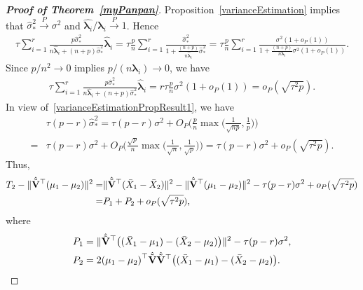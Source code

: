 \documentclass[times,sort&compress,3p]{elsarticle}
\newcommand{\bfsym}[1]{\ensuremath{\boldsymbol{#1}}}
\def\blambda {\bfsym {\lambda}}        \def\bLambda {\bfsym {\Lambda}}
\theoremstyle{plain}
\theoremstyle{definition}
\theoremstyle{remark}
\begin{document}
\begin{appendices}
\begin{proof}[\textbf{Proof of Theorem~\ref{myPanpan}}]
    Proposition~\ref{varianceEstimation} implies that $\hat{\sigma}_{*}^2\xrightarrow{P} \sigma^2$ and $\hat{\blambda_i}/\blambda_i\xrightarrow{P} 1$.
    Hence
    $$
    \begin{aligned} 
 \tau\sum_{i=1}^r \frac{p\hat{\sigma}_*^2}{n\hat{\blambda}_i+(n+p)\hat{\sigma}_*^2}\hat{\blambda}_i
        =
        \tau\frac{p}{n}\sum_{i=1}^r \frac{\hat{\sigma}_*^2}{1+\frac{(n+p)}{n\hat{\blambda}_i}\hat{\sigma}_*^2}
        =
        \tau\frac{p}{n}\sum_{i=1}^r \frac{\sigma^2(1+o_P(1))}{1+\frac{(n+p)}{n\blambda_i}\sigma^2(1+o_P(1))}.
    \end{aligned}
    $$
    Since $p/n^2\to 0$ implies $p/(n\blambda_i)\to 0$, we have
    $$
    \begin{aligned} 
 \tau\sum_{i=1}^r \frac{p\hat{\sigma}_*^2}{n\hat{\blambda}_i+(n+p)\hat{\sigma}_*^2}\hat{\blambda}_i
        =r\tau \frac{p}{n} \sigma^2(1+o_P(1))=o_P(\sqrt{\tau^2 p}).
    \end{aligned}
    $$
    In view of~\eqref{varianceEstimationPropResult1}, we have
    $$
    \begin{aligned}
        &\tau(p-r)\hat{\sigma}_*^2 =
    \tau(p-r)\sigma^2 + O_P\Big(\frac{p}{n}\max\big(\frac{1}{\sqrt{np}},\frac{1}{p}\big)\Big)\\
        =&
        \tau(p-r)\sigma^2 + O_P\Big(\frac{\sqrt{p}}{n}\max\big(\frac{1}{\sqrt{n}},\frac{1}{\sqrt{p}}\big)\Big)
        =\tau(p-r)\sigma^2 + o_P(\sqrt{\tau^2 p}).
    \end{aligned}
    $$
Thus,
\begin{equation*}
    \begin{aligned}
        T_2-\|\hat{\tilde{\mathbf{V}}}^\top (\mu_1-\mu_2)\|^2
        =&
        \|\hat{\tilde{\mathbf{V}}}^\top (\bar{X}_1-\bar{X}_2)\|^2-\|\hat{\tilde{\mathbf{V}}}^\top (\mu_1-\mu_2)\|^2
-\tau (p-r)\sigma^2
        +o_P(\sqrt{\tau^2 p})\\
        =&P_1+P_2
        +o_P(\sqrt{\tau^2 p}),
    \end{aligned}
\end{equation*}
where
\begin{align*}
    P_1&=\|\hat{\tilde{\mathbf{V}}}^\top \big((\bar{X}_1-\mu_1)-(\bar{X}_2-\mu_2)\big)\|^2- \tau (p-r)\sigma^2,\\
    P_2&=2{(\mu_1-\mu_2)}^\top  \hat{\tilde{\mathbf{V}}}\hat{\tilde{\mathbf{V}}}^\top \big((\bar{X}_1-\mu_1)-(\bar{X}_2-\mu_2)\big).
\end{align*}



\end{proof}
\end{appendices}
\end{document}
